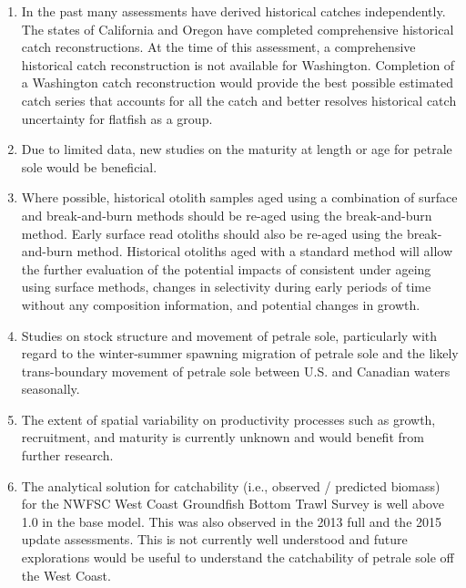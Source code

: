 \documentclass[12pt,]{article}
\begin{document}
\begin{enumerate}

\item In the past many assessments have derived historical catches independently. The states of California and Oregon have completed comprehensive historical catch reconstructions. At the time of this assessment, a comprehensive historical catch reconstruction is not available for Washington. Completion of a Washington catch reconstruction would provide the best possible estimated catch series that accounts for all the catch and better resolves historical catch uncertainty for flatfish as a group.

\item Due to limited data, new studies on the maturity at length or age for petrale sole would be beneficial.

\item Where possible, historical otolith samples aged using a combination of surface and break-and-burn methods should be re-aged using the break-and-burn method. Early surface read otoliths should also be re-aged using the break-and-burn method. Historical otoliths aged with a standard method will allow the further evaluation of the potential impacts of consistent under ageing using surface methods, changes in selectivity during early periods of time without any composition information, and potential changes in growth.

\item Studies on stock structure and movement of petrale sole, particularly with regard to the winter-summer spawning migration of petrale sole and the likely trans-boundary movement of petrale sole between U.S. and Canadian waters seasonally.

\item The extent of spatial variability on productivity processes such as growth, recruitment, and maturity is currently unknown and would benefit from further research.

\item The analytical solution for catchability (i.e., observed / predicted biomass) for the NWFSC West Coast Groundfish Bottom Trawl Survey is well above 1.0 in the base model.  This was also observed in the 2013 full and the 2015 update assessments.  This is not currently well understood and future explorations would be useful to understand the catchability of petrale sole off the West Coast.

\end{enumerate}
\end{document}
